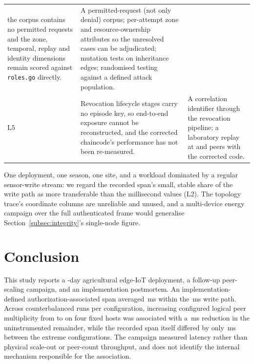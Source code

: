 \documentclass[a4paper,fleqn]{cas-sc}
\begin{document}
\begin{table}[pos=t]
\begin{tabularx}{\columnwidth}{@{}p{}Xp{}@{}}
     the corpus contains no permitted requests and the zone, temporal,
     replay and identity dimensions remain scored against
     \texttt{roles.go} directly. &
     A permitted-request (not only denial) corpus; per-attempt zone and
     resource-ownership attributes so the unresolved cases can be
     adjudicated; mutation tests on inheritance edges; randomised testing
     against a defined attack population. \\
L5 & Revocation lifecycle stages carry no episode key, so end-to-end
     exposure cannot be reconstructed, and the corrected chaincode's
     performance has not been re-measured. &
     A correlation identifier through the revocation pipeline; a
     laboratory replay at \ScaleMinPeers{} and \ScaleMaxPeers{} peers with
     the corrected code. \\
\bottomrule
\end{tabularx}
\end{table}

One deployment, one season, one site, and a workload dominated by a
regular sensor-write stream: we regard the recorded span's small, stable
share of the write path as more transferable than the millisecond values
(L2). The topology trace's coordinate columns are unreliable and unused,
and a multi-device energy campaign over the full authenticated frame would
generalise Section~\ref{subsec:integrity}'s single-node figure.

\FloatBarrier
\section{Conclusion}
\label{sec:conclusion}

This study reports a \DeployDays-day agricultural edge-IoT deployment, a
follow-up peer-scaling campaign, and an implementation postmortem. An
implementation-defined authorization-associated span averaged
\PartAccess\,ms within the \PartTotal\,ms write path. Across
\PartRunsPerConfig{} counterbalanced runs per configuration, increasing
configured logical peer multiplicity from \ScaleMinPeers{} to
\ScaleMaxPeers{} on four fixed hosts was associated with a
\PartEndorser\,ms reduction in the uninstrumented remainder, while the
recorded span itself differed by only \PartTostDiff\,ms between the
extreme configurations. The campaign measured latency rather than
physical scale-out or peer-count throughput, and does not identify the
internal mechanism responsible for the association.
\end{document}

